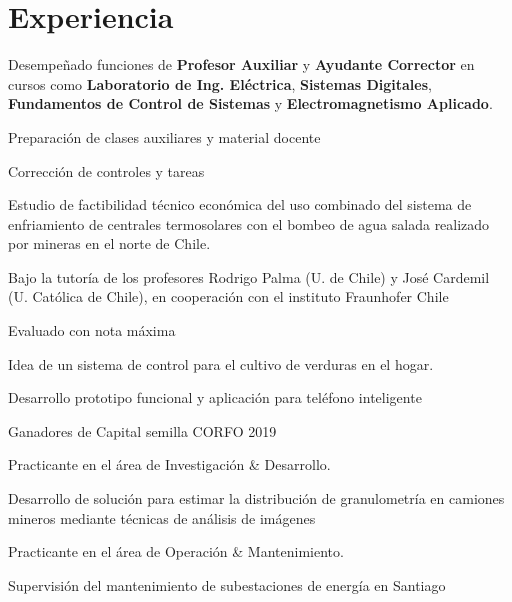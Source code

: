 \section{Experiencia \faGears}
Desempeñado funciones de \textbf{Profesor Auxiliar} y \textbf{Ayudante Corrector} en cursos como \textbf{Laboratorio de Ing. Eléctrica}, \textbf{Sistemas Digitales}, \textbf{Fundamentos de Control de Sistemas} y \textbf{Electromagnetismo Aplicado}. 
\begin{tightemize}
\item Preparación de clases auxiliares y material docente
\item Corrección de controles y tareas
\end{tightemize}
\sectionsep

Estudio de factibilidad técnico económica del uso combinado del sistema de enfriamiento de centrales termosolares con el bombeo de agua salada realizado por mineras en el norte de Chile.
\begin{tightemize}
\item Bajo la tutoría de los profesores Rodrigo Palma (U. de Chile) y José Cardemil (U. Católica de Chile), en cooperación con el instituto Fraunhofer Chile
\item Evaluado con nota máxima
\end{tightemize}
\sectionsep

Idea de un sistema de control para el cultivo de verduras en el hogar.
\begin{tightemize}
\item Desarrollo prototipo funcional y aplicación para teléfono inteligente
\item Ganadores de Capital semilla CORFO 2019
\end{tightemize}
\sectionsep

Practicante en el área de Investigación \& Desarrollo.
\begin{tightemize}
\item Desarrollo de solución para estimar la distribución de granulometría en camiones mineros mediante técnicas de análisis de imágenes
\end{tightemize}
\sectionsep

Practicante en el área de Operación \& Mantenimiento.
\begin{tightemize}
\item Supervisión del mantenimiento de subestaciones de energía en Santiago
\end{tightemize}
\sectionsep